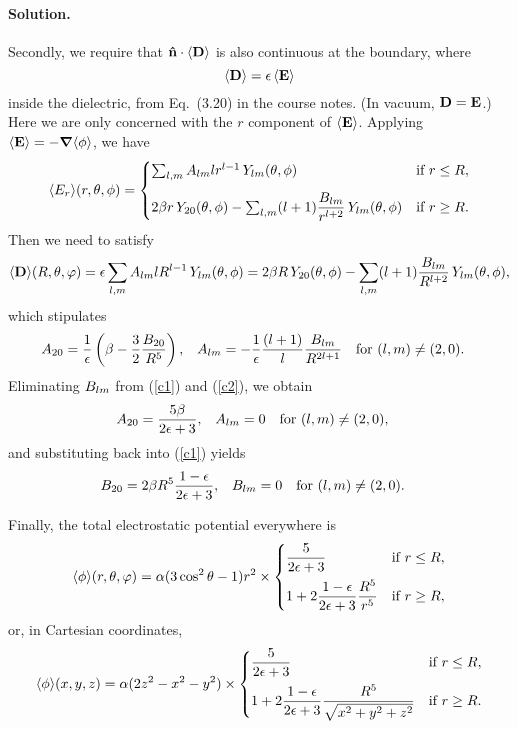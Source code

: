\documentclass[11pt]{article}
\newcommand{\vfix}{\vspace{-\baselineskip}}
\newcommand{\refeq}[1]{(\ref{#1})}
\newcommand{\beq}{\begin{equation*}}
\newcommand{\eeq}{\end{equation*}}
\newcommand{\beqn}{\begin{equation}}
\newcommand{\eeqn}{\end{equation}}
\newenvironment{solution}
{
    \paragraph{Solution.}
    \ignorespaces
}
{
    \bigskip
}
\begin{document}
\begin{solution}
	Secondly, we require that $\nh \cdot \evD$ is also continuous at the boundary, where
	\beq
		\evD = \eps \evE
	\eeq
	inside the dielectric, from Eq.~(3.20) in the course notes.  (In vacuum, $\vb{D} = \vb{E}$.)  Here we are only concerned with the $r$ component of $\evE$.  Applying $\evE = -\grad\!\evphi$, we have
	\beq
		\evEr\!(r, \tht, \phi) = \begin{cases} \sum_{l,m} \Alm l r^{l-1} \, \Ylm\tv & \tif r \leq R, \\[2ex]
		2 \beta r \, \Ytotv - \sum_{l,m} (l + 1) \dfrac{\Blm}{r^{l+2}} \, \Ylm\tv & \tif r \geq R. \end{cases}
	\eeq
	Then we need to satisfy
	\beq
		\evD\!(R, \tht, \vph) = \eps \sum_{l,m} \Alm l R^{l-1} \, \Ylm\tv = 2 \beta R \, \Ytotv - \sum_{l,m} (l + 1) \dfrac{\Blm}{R^{l+2}} \, \Ylm\tv,
	\eeq
	which stipulates
	\begin{align} \label{c2}
		A_{2 0} &= \frac{1}{\epsilon} \left( \beta - \frac{3}{2} \frac{B_{2 0}}{R^{5}} \right), &
		A_{l m} &= -\frac{1}{\epsilon} \frac{(l + 1)}{l} \frac{B_{l m}}{R^{2l+1}} \quad \text{for } (l,m) \neq (2,0).
	\end{align}
	Eliminating $B_{l m}$ from \refeq{c1} and \refeq{c2}, we obtain
	\begin{align*}
		A_{2 0} &= \frac{5 \beta}{2\epsilon + 3}, &
		A_{l m} &= 0 \quad \text{for } (l,m) \neq (2,0),
	\end{align*}
	and substituting back into \refeq{c1} yields
	\begin{align*}
		B_{2 0} &= 2 \beta R^5 \frac{1 - \epsilon}{2\epsilon + 3}, &
		B_{l m} &= 0 \quad \text{for } (l,m) \neq (2,0).
	\end{align*}
	
	Finally, the total electrostatic potential everywhere is
	\beqn \label{phisph}
		\evphi\!(r, \tht, \vph) = \alp (3 \cos^2\tht - 1) r^2 \times
		\begin{cases} \dfrac{5}{2\eps + 3} & \tif r \leq R, \\[2ex]
		1 + 2 \dfrac{1 - \eps}{2\eps + 3} \dfrac{R^5}{r^5} & \tif r \geq R,\end{cases}
	\eeqn
	or, in Cartesian coordinates,
	\beq
		\evphi\!(x, y, z) = \alp (2z^2 - x^2 - y^2) \times
		\begin{cases} \dfrac{5}{2\eps + 3} & \tif r \leq R, \\[2ex]
		1 + 2 \dfrac{1 - \eps}{2\eps + 3} \dfrac{R^5}{\sqrt{x^2 + y^2 + z^2}} & \tif r \geq R.\end{cases}
	\eeq
\end{solution}
\vfix
\end{document}
